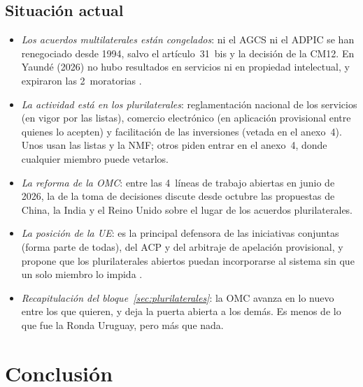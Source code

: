 \documentclass[11pt]{article}
\begin{document}
\subsection{Situación actual}\label{sec:situacion}

\begin{itemize}
\item \emph{Los acuerdos multilaterales están congelados}: ni el AGCS ni el ADPIC se han renegociado desde 1994, salvo el artículo~31~bis y la decisión de la CM12. En Yaundé (2026) no hubo resultados en servicios ni en propiedad intelectual, y expiraron las 2~moratorias .
\item \emph{La actividad está en los plurilaterales}: reglamentación nacional de los servicios (en vigor por las listas), comercio electrónico (en aplicación provisional entre quienes lo acepten) y facilitación de las inversiones (vetada en el anexo~4). Unos usan las listas y la NMF; otros piden entrar en el anexo~4, donde cualquier miembro puede vetarlos.
\item \emph{La reforma de la OMC}: entre las 4~líneas de trabajo abiertas en junio de 2026, la de la toma de decisiones discute desde octubre las propuestas de China, la India y el Reino Unido sobre el lugar de los acuerdos plurilaterales\nocite{OMC2026Reforma}.
\item \emph{La posición de la UE}: es la principal defensora de las iniciativas conjuntas (forma parte de todas), del ACP y del arbitraje de apelación provisional, y propone que los plurilaterales abiertos puedan incorporarse al sistema sin que un solo miembro lo impida\nocite{CE2026OMC} .
\item \emph{Recapitulación del bloque~\ref{sec:plurilaterales}}: la OMC avanza en lo nuevo entre los que quieren, y deja la puerta abierta a los demás. Es menos de lo que fue la Ronda Uruguay, pero más que nada.
\end{itemize}

\section*{Conclusión}
\end{document}
